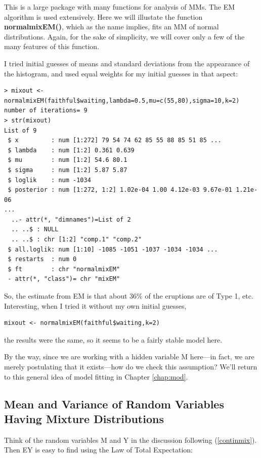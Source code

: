 \documentclass[11pt]{article}
\begin{document}
This is a large package with many functions for analysis of MMs.  The EM
algorithm is used extensively.  Here we will illustate the function
\textbf{normalmixEM()}, which as the name implies, fits an MM of normal
distributions.  Again, for the sake of simplicity, we will cover only a
few of the many features of this function.

I tried initial guesses of means and standard deviations from the
appearance of the histogram, and used equal weights for my initial
guesses in that aspect:

\begin{lstlisting}
> mixout <- normalmixEM(faithful$waiting,lambda=0.5,mu=c(55,80),sigma=10,k=2)
number of iterations= 9 
> str(mixout)
List of 9
 $ x         : num [1:272] 79 54 74 62 85 55 88 85 51 85 ...
 $ lambda    : num [1:2] 0.361 0.639
 $ mu        : num [1:2] 54.6 80.1
 $ sigma     : num [1:2] 5.87 5.87
 $ loglik    : num -1034
 $ posterior : num [1:272, 1:2] 1.02e-04 1.00 4.12e-03 9.67e-01 1.21e-06
...
  ..- attr(*, "dimnames")=List of 2
  .. ..$ : NULL
  .. ..$ : chr [1:2] "comp.1" "comp.2"
 $ all.loglik: num [1:10] -1085 -1051 -1037 -1034 -1034 ...
 $ restarts  : num 0
 $ ft        : chr "normalmixEM"
 - attr(*, "class")= chr "mixEM"
\end{lstlisting}

So, the estimate from EM is that about 36\% of the eruptions are of Type
1, etc.  Interesting, when I tried it without my own initial guesses,

\begin{lstlisting}
mixout <- normalmixEM(faithful$waiting,k=2)
\end{lstlisting}

the results were the same, so it seems to be a fairly stable model here.

By the way, since we are working with a hidden variable M here---in
fact, we are merely postulating that it exists---how do we check this
assumption?  We'll return to this general idea of model fitting in
Chapter \ref{chap:mod}.

\subsection{Mean and Variance of Random Variables Having Mixture
Distributions}
\label{mixmeanvar}

Think of the random variables M and Y in the discussion following
(\ref{continmix}).  Then EY is easy to find using the Law of Total
Expectation:
\end{document}
